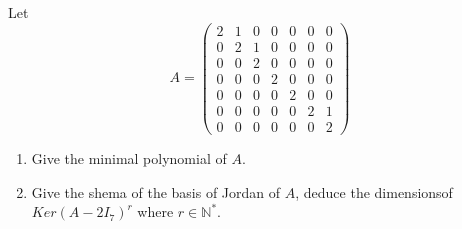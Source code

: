 \documentclass[12pt]{article}
\begin{document}
\section{}
Let $$A = 
\begin{pmatrix}
  2 & 1 & 0 & 0 & 0 & 0 & 0 \\
  0 & 2 & 1 & 0 & 0 & 0 & 0 \\
  0 & 0 & 2 & 0 & 0 & 0 & 0 \\
  0 & 0 & 0 & 2 & 0 & 0 & 0 \\
  0 & 0 & 0 & 0 & 2 & 0 & 0 \\
  0 & 0 & 0 & 0 & 0 & 2 & 1 \\
  0 & 0 & 0 & 0 & 0 & 0 & 2
\end{pmatrix}$$

\begin{enumerate}
  \item Give the minimal polynomial of $A$.
  \item Give the shema of the basis of Jordan of $A$, deduce the dimensionsof $Ker(A-2I_7)^r$ where $r \in \mathbb{N}^*$.
\end{enumerate}
\end{document}

